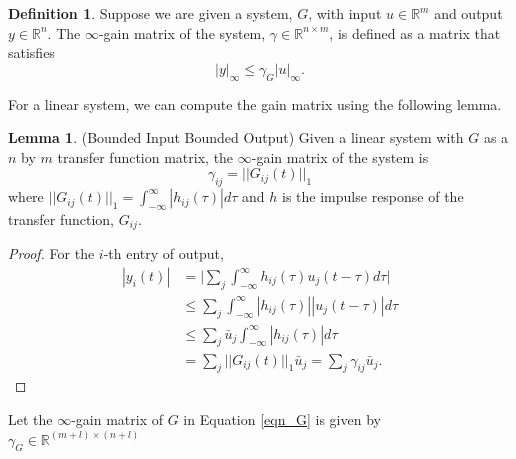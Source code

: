 \documentclass[journal]{IEEEtran}
\theoremstyle{definition}
\newtheorem{definition}{Definition}
\newtheorem{lemma}{Lemma}
\begin{document}
\begin{definition}
Suppose we are given a system, $G$, with input $u\in\mathbb{R}^m$ and output $y\in\mathbb{R}^{n}$. The $\infty$-gain matrix of the system, $\gamma\in\mathbb{R}^{n\times m}$, is defined as a matrix that satisfies
\begin{equation}
|y|_\infty\leq\gamma_G|u|_\infty.
\label{eqn_infty_gain}
\end{equation}
\end{definition}

For a linear system, we can compute the gain matrix using the following lemma.

\begin{lemma} (Bounded Input Bounded Output)
Given a linear system with $G$ as a $n$ by $m$ transfer function matrix, the $\infty$-gain matrix of the system is
\begin{equation}
\gamma_{ij}=||G_{ij}(t)||_1
\end{equation}
where $||G_{ij}(t)||_1=\int_{-\infty}^{\infty}|h_{ij}(\tau)|d\tau$ and $h$ is the impulse response of the transfer function, $G_{ij}$.

\label{lemma_BIBO}
\end{lemma}
\begin{proof}
For the $i$-th entry of output,
$$\begin{aligned}|y_i(t)|&=\bigg|\sum_j\int_{-\infty}^{\infty}h_{ij}(\tau)u_j(t-\tau)d\tau\bigg| \\
& \leq \sum_j\int_{-\infty}^{\infty}|h_{ij}(\tau)| |u_j(t-\tau)|d\tau \\
& \leq \sum_j\bar{u}_j\int_{-\infty}^{\infty}|h_{ij}(\tau)|d\tau \\
&=\sum_j||G_{ij}(t)||_1\bar{u}_j=\sum_j\gamma_{ij}\bar{u}_j.
\end{aligned}$$
\end{proof}

Let the $\infty$-gain matrix of $G$ in Equation \ref{eqn_G} is given by $\gamma_G\in\mathbb{R}^{(m+l)\times(n+l)}$
\end{document}
